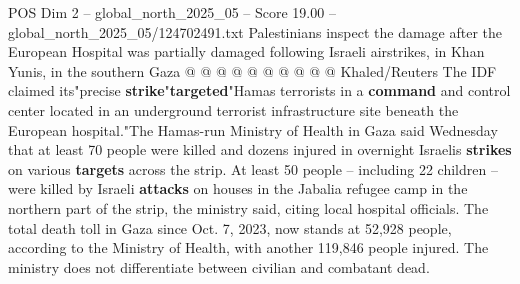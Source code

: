 \begin{textsample}{POS Dim 2 – global\_north\_2025\_05 – Score 19.00 – global\_north\_2025\_05/124702491.txt}
Palestinians inspect the damage after the European Hospital was partially damaged following Israeli airstrikes, in Khan Yunis, in the southern Gaza @ @ @ @ @ @ @ @ @ @ Khaled/Reuters The IDF claimed its"precise \textbf{strike}"\textbf{targeted}"Hamas terrorists in a \textbf{command} and control center located in an underground terrorist infrastructure site beneath the European hospital."The Hamas-run Ministry of Health in Gaza said Wednesday that at least 70 people were killed and dozens injured in overnight Israelis \textbf{strikes} on various \textbf{targets} across the strip.
At least 50 people -- including 22 children -- were killed by Israeli \textbf{attacks} on houses in the Jabalia refugee camp in the northern part of the strip, the ministry said, citing local hospital officials.
The total death toll in Gaza since Oct. 7, 2023, now stands at 52,928 people, according to the Ministry of Health, with another 119,846 people injured.
The ministry does not differentiate between civilian and combatant dead.

\end{textsample}
